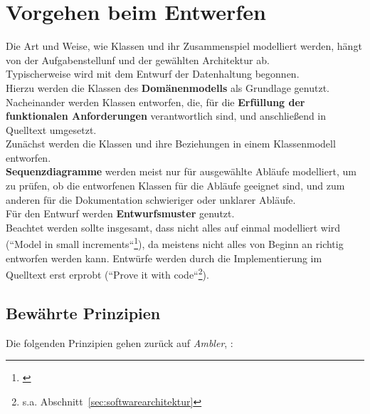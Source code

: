 \section{Vorgehen beim Entwerfen}
Die Art und Weise, wie Klassen und ihr Zusammenspiel modelliert werden, hängt von der Aufgabenstellunf und der gewählten Architektur ab.\\

\noindent
Typischerweise wird mit dem Entwurf der Datenhaltung begonnen.\\
Hierzu werden die Klassen des \textbf{Domänenmodells} als Grundlage genutzt.\\

\noindent
Nacheinander werden Klassen entworfen, die, für die \textbf{Erfüllung der funktionalen Anforderungen} verantwortlich sind, und anschließend in Quelltext umgesetzt.\\

\noindent
Zunächst werden die Klassen und ihre Beziehungen in einem Klassenmodell entworfen.\\

\noindent
\textbf{Sequenzdiagramme} werden meist nur für ausgewählte Abläufe modelliert, um zu prüfen, ob die entworfenen Klassen für die Abläufe geeignet sind, und zum anderen für die Dokumentation schwieriger oder unklarer Abläufe.\\

\noindent
Für den Entwurf werden \textbf{Entwurfsmuster} genutzt.\\

\noindent
Beachtet werden sollte insgesamt, dass nicht alles auf einmal modelliert wird (``Model in small increments``\footnote{\cite[51]{Wed09b}}), da meistens nicht alles von Beginn an richtig entworfen werden kann.
Entwürfe werden durch die Implementierung im Quelltext erst erprobt (``Prove it with code``\footnote{
    s.a. Abschnitt~\ref{sec:softwarearchitektur}
}).

\subsection*{Bewährte Prinzipien}

Die folgenden Prinzipien gehen zurück auf \textit{Ambler}, \cite[112, Table 4.2. The Supplementary Principles of AM]{Amb04}:

